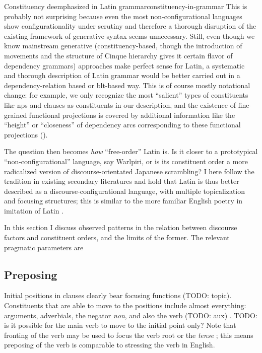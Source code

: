 \documentclass[a4paper, oneside]{report}
\newcommand*{\citesec}[1]{\S~{#1}}
\newcommand*{\citepage}[1]{p.~{#1}}
\newcommand{\form}[1]{\emph{#1}}
\begin{document}
\begin{theorybox}{Constituency deemphasized in Latin grammar}{constituency-in-grammar}
    This is probably not surprising because
    even the most non-configurational languages show configurationality 
    under scrutiny
    \citep[among others]{niedzielski2017clausal,morris2018evidence,legate2002warlpiri}
    and therefore a thorough disruption 
    of the existing framework of generative syntax seems unnecessary.
    Still, even though we know mainstream generative (constituency-based, 
    though the introduction of movements and the structure of Cinque hierarchy
    gives it certain flavor of dependency grammars) approaches make perfect sense for Latin,
    a systematic and thorough description of Latin grammar 
    would be better carried out in a dependency-relation based or \acs{blt}-based way.
    This is of course mostly notational change:
    for example, we only recognize the most ``salient'' types of constituents 
    like \acs{np}s and clauses as constituents in our description,
    and the existence of fine-grained functional projections is covered by 
    additional information like the ``height'' or ``closeness'' of dependency arcs
    corresponding to these functional projections
    ().
\end{theorybox}

The question then becomes \emph{how} ``free-order'' Latin is.
Is it closer to a prototypical ``non-configurational'' language, say Warlpiri, 
or is its constituent order a more radicalized version of 
discourse-orientated Japanese scrambling?
I here follow the tradition in existing secondary literatures 
and hold that 
Latin is thus better described as a discourse-configurational language,
with multiple topicalization and focusing structures;
this is similar to the more familiar English poetry 
in imitation of Latin \citep[\citesec{600}]{allen1903allen}.

In this section I discuss observed patterns in 
the relation between discourse factors 
and constituent orders,
and the limits of the former.
The relevant pragmatic parameters are 

\subsection{Preposing}

Initial positions in clauses clearly bear focusing functions (TODO: topic).
Constituents that are able to move to the positions 
include almost everything: 
arguments, adverbials, the negator \form{non}, 
and also the verb (TODO: aux) 
\citep[\citesec{598}]{allen1903allen}. 
TODO: is it possible for the main verb to move to the initial point only?
Note that fronting of the verb may be used 
to focus the verb root or the \emph{tense}
\citep[\citepage{397}]{allen1903allen};
this means preposing of the verb is comparable to 
stressing the verb in English.
\end{document}
